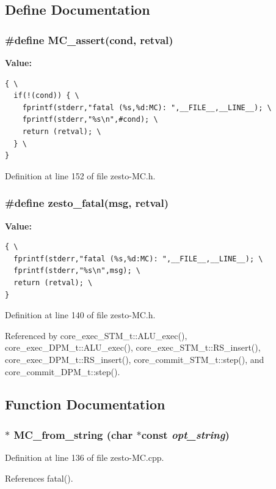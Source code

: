 \subsection{Define Documentation}
\subsubsection[{MC\_\-assert}]{\setlength{\rightskip}{0pt plus 5cm}\#define MC\_\-assert(cond, \/  retval)}\label{zesto-MC_8h_e052e32e386736d85fc7aab9439818ec}


\textbf{Value:}

\begin{Code}\begin{verbatim}{ \
  if(!(cond)) { \
    fprintf(stderr,"fatal (%s,%d:MC): ",__FILE__,__LINE__); \
    fprintf(stderr,"%s\n",#cond); \
    return (retval); \
  } \
}
\end{verbatim}
\end{Code}


Definition at line 152 of file zesto-MC.h.
\subsubsection[{zesto\_\-fatal}]{\setlength{\rightskip}{0pt plus 5cm}\#define zesto\_\-fatal(msg, \/  retval)}\label{zesto-MC_8h_a62f33e5d3102234e8f957f4722f5f51}


\textbf{Value:}

\begin{Code}\begin{verbatim}{ \
  fprintf(stderr,"fatal (%s,%d:MC): ",__FILE__,__LINE__); \
  fprintf(stderr,"%s\n",msg); \
  return (retval); \
}
\end{verbatim}
\end{Code}


Definition at line 140 of file zesto-MC.h.

Referenced by core\_\-exec\_\-STM\_\-t::ALU\_\-exec(), core\_\-exec\_\-DPM\_\-t::ALU\_\-exec(), core\_\-exec\_\-STM\_\-t::RS\_\-insert(), core\_\-exec\_\-DPM\_\-t::RS\_\-insert(), core\_\-commit\_\-STM\_\-t::step(), and core\_\-commit\_\-DPM\_\-t::step().

\subsection{Function Documentation}
\subsubsection[{MC\_\-from\_\-string}]{$\ast$ MC\_\-from\_\-string (char $\ast$const  {\em opt\_\-string})}\label{zesto-MC_8h_3315f7f39183ca89969f662f65e2016c}




Definition at line 136 of file zesto-MC.cpp.

References fatal().